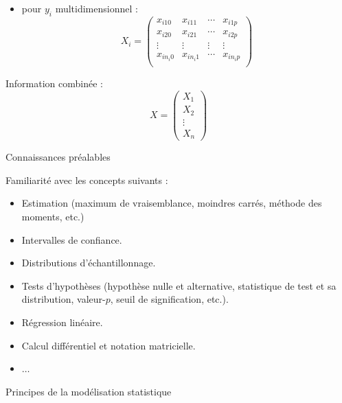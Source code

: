 \documentclass{BeamerTemplate}
\begin{document}
\begin{refsection}
\begin{frame}{}
\begin{itemize}
\item pour $y_i$ multidimensionnel :
$$X_i = \left(
\begin{array}{cccc}
x_{i10} & x_{i11} & \cdots & x_{i1p}\\
x_{i20} & x_{i21} & \cdots & x_{i2p}\\
\vdots & \vdots & \vdots & \vdots \\
x_{in_i0} & x_{in_i1} & \cdots & x_{in_ip}\\
\end{array} \right)$$
\end{itemize}

Information combinée :
$$X = \left(
\begin{array}{c}
X_1 \\
X_2 \\
\vdots\\
X_n
\end{array} \right) $$
\end{frame}

\begin{frame}{Connaissances préalables}

Familiarité avec les concepts suivants :
\begin{itemize}
\item Estimation (maximum de vraisemblance, moindres carrés, méthode des moments, etc.)
\item Intervalles de confiance.
\item Distributions d'échantillonnage.
\item Tests d'hypothèses (hypothèse nulle et alternative, statistique de test et
sa distribution, valeur-$p$, seuil de signification, etc.).
\item Régression linéaire.
\item Calcul différentiel et notation matricielle.
\item $\ldots$
\end{itemize}

\end{frame}


\begin{frame}[allowframebreaks]{Principes de la modélisation statistique}

\bigskip


\end{frame}
\end{refsection}
\end{document}
